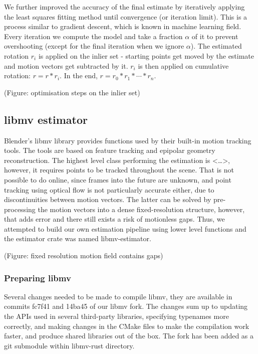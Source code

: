\documentclass[11pt,english]{report}
\begin{document}
We further improved the accuracy of the final estimate by iteratively applying the least squares fitting method until convergence (or iteration limit). This is a process similar to gradient descent, which is known in machine learning field. Every iteration we compute the model and take a fraction $\alpha$ of it to prevent overshooting (except for the final iteration when we ignore $\alpha$). The estimated rotation $r_i$ is applied on the inlier set - starting points get moved by the estimate and motion vectors get subtracted by it. $r_i$ is then applied on cumulative rotation: $r = r * r_i$. In the end, $r = r_0 * r_1 * \cdots * r_n$.

(Figure: optimisation steps on the inlier set)

\subsection{libmv estimator}

Blender's libmv library provides functions used by their built-in motion tracking tools\cite{blender-motion-tracking}. The tools are based on feature tracking and epipolar geometry reconstruction. The highest level class performing the estimation is <\ldots>, however, it requires points to be tracked throughout the scene. That is not possible to do online, since frames into the future are unknown, and point tracking using optical flow is not particularly accurate either, due to discontinuities between motion vectors. The latter can be solved by pre-processing the motion vectors into a dense fixed-resolution structure, however, that adds error and there still exists a risk of motionless gaps. Thus, we attempted to build our own estimation pipeline using lower level functions and the estimator crate was named libmv-estimator.

(Figure: fixed resolution motion field contains gaps)

\subsubsection{Preparing libmv}

Several changes needed to be made to compile libmv, they are available in commits fc7f41\cite{fc7f41a484c3cb8df94e71b591076ab3c9e84827} and 14ba45\cite{14ba45e82847ff6bc98edad5abfd67c212328482} of our libmv fork\cite{libmv-fork}. The changes sum up to updating the APIs used in several third-party libraries, specifying typenames more correctly, and making changes in the CMake files to make the compilation work faster, and produce shared libraries out of the box. The fork has been added as a git submodule within libmv-rust directory.
\end{document}
